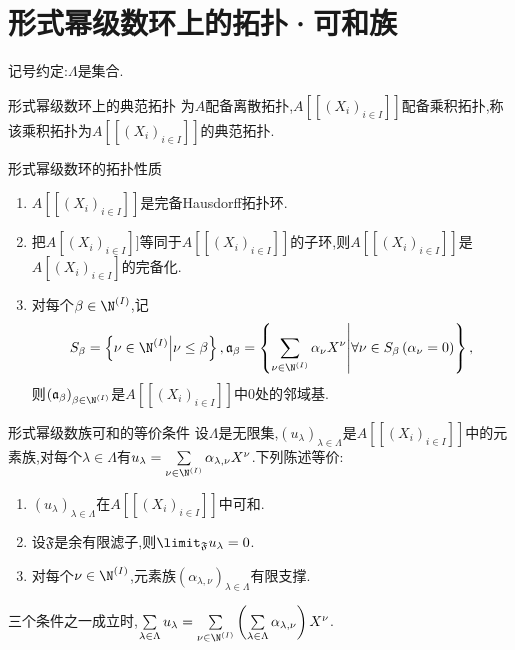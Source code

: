 \section{形式幂级数环上的拓扑·可和族}

记号约定:$\Lambda$是集合.

\begin{definition}{形式幂级数环上的典范拓扑}{}
	为$A$配备离散拓扑,$A[[(X_{i})_{i\in I}]]$配备乘积拓扑,称该乘积拓扑为$A[[(X_{i})_{i\in I}]]$的典范拓扑.
\end{definition}

\begin{proposition}{形式幂级数环的拓扑性质}{}
	\begin{enumerate}
		\item $A[[(X_{i})_{i\in I}]]$是完备Hausdorff拓扑环.
		\item 把$A[(X_{i})_{i\in I}]]$等同于$A[[(X_{i})_{i\in I}]]$的子环,则$A[[\left(X_{i}\right)_{i\in I}]]$是$A[(X_{i})_{i\in I}]$的完备化.
		\item 对每个$\beta\in\N^{\left(I\right)}$,记
		\begin{align*}
			S_{\beta}=\left\{\nu\in\N^{\left(I\right)}\middle|\nu\leq\beta\right\},\mathfrak{a}_{\beta}=\left\{\sum\limits_{\nu\in\N^{\left(I\right)}}\alpha_{\nu}X^{\nu}\middle|\forall\nu\in S_{\beta}\left(\alpha_{\nu}=0\right)\right\},
		\end{align*}
		则$\left(\mathfrak{a}_{\beta}\right)_{\beta\in\N^{\left(I\right)}}$是$A[[(X_{i})_{i\in I}]]$中$0$处的邻域基.
	\end{enumerate}
\end{proposition}

\begin{lemma}{形式幂级数族可和的等价条件}{}
	设$\Lambda$是无限集,$\left(u_{\lambda}\right)_{\lambda\in\Lambda}$是$A[[(X_{i})_{i\in I}]]$中的元素族,对每个$\lambda\in\Lambda$有$u_{\lambda}=\sum\limits_{\nu\in\N^{\left(I\right)}}\alpha_{\lambda,\nu}X^{\nu}$.下列陈述等价:
	\begin{enumerate}
		\item $\left(u_{\lambda}\right)_{\lambda\in\Lambda}$在$A[[(X_{i})_{i\in I}]]$中可和.
		\item 设$\mathfrak{F}$是余有限滤子,则$\limit_{\mathfrak{F}}u_{\lambda}=0$.
		\item 对每个$\nu\in\N^{\left(I\right)}$,元素族$\left(\alpha_{\lambda,\nu}\right)_{\lambda\in\Lambda}$有限支撑.
	\end{enumerate}
	三个条件之一成立时,$\sum\limits_{\lambda\in\Lambda}u_{\lambda}=\sum\limits_{\nu\in\N^{\left(I\right)}}\left(\sum\limits_{\lambda\in\Lambda}\alpha_{\lambda,\nu}\right)X^{\nu}$.
\end{lemma}

